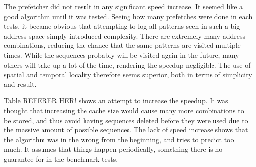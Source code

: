 The prefetcher did not result in any significant speed increase. It seemed like a good algorithm until it was tested. Seeing how many prefetches were done in each tests, it became obvious that attempting to log all patterns seen in such a big address space simply introduced complexity. There are extremely many address combinations, reducing the chance that the same patterns are visited multiple times. While the sequences probably will be visited again in the future, many others will take up a lot of the time, rendering the speedup negligible. The use of spatial and temporal locality therefore seems superior, both in terms of simplicity and result.

Table REFERER HER! shows an attempt to increase the speedup. It was thought that increasing the cache size would cause many more combinations to be stored, and thus avoid having sequences deleted before they were used due to the massive amount of possible sequences. The lack of speed increase shows that the algorithm was in the wrong from the beginning, and tries to predict too much. It assumes that things happen periodically, something there is no guarantee for in the benchmark tests.

%
%
%
